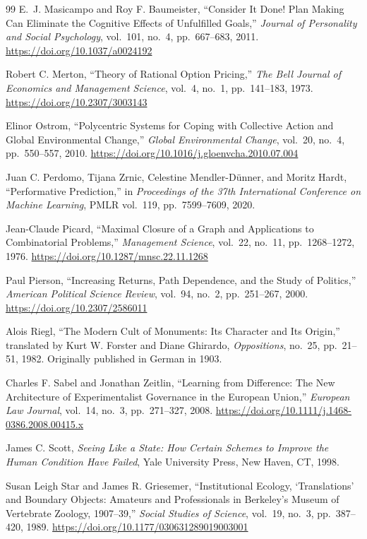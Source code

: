 \begin{thebibliography}{99}
E.~J. Masicampo and Roy F. Baumeister,
``Consider It Done! Plan Making Can Eliminate the Cognitive Effects
of Unfulfilled Goals,''
\textit{Journal of Personality and Social Psychology},
vol.~101, no.~4, pp.~667--683, 2011.
\url{https://doi.org/10.1037/a0024192}

Robert C. Merton,
``Theory of Rational Option Pricing,''
\textit{The Bell Journal of Economics and Management Science},
vol.~4, no.~1, pp.~141--183, 1973.
\url{https://doi.org/10.2307/3003143}

Elinor Ostrom,
``Polycentric Systems for Coping with Collective Action and Global
Environmental Change,''
\textit{Global Environmental Change},
vol.~20, no.~4, pp.~550--557, 2010.
\url{https://doi.org/10.1016/j.gloenvcha.2010.07.004}

Juan C. Perdomo, Tijana Zrnic, Celestine Mendler-D\"unner, and Moritz Hardt,
``Performative Prediction,''
in \textit{Proceedings of the 37th International Conference on Machine Learning},
PMLR vol.~119, pp.~7599--7609, 2020.

Jean-Claude Picard,
``Maximal Closure of a Graph and Applications to Combinatorial Problems,''
\textit{Management Science},
vol.~22, no.~11, pp.~1268--1272, 1976.
\url{https://doi.org/10.1287/mnsc.22.11.1268}

Paul Pierson,
``Increasing Returns, Path Dependence, and the Study of Politics,''
\textit{American Political Science Review},
vol.~94, no.~2, pp.~251--267, 2000.
\url{https://doi.org/10.2307/2586011}

Alois Riegl,
``The Modern Cult of Monuments: Its Character and Its Origin,''
translated by Kurt W. Forster and Diane Ghirardo,
\textit{Oppositions},
no.~25, pp.~21--51, 1982.
Originally published in German in 1903.

Charles F. Sabel and Jonathan Zeitlin,
``Learning from Difference: The New Architecture of Experimentalist
Governance in the European Union,''
\textit{European Law Journal},
vol.~14, no.~3, pp.~271--327, 2008.
\url{https://doi.org/10.1111/j.1468-0386.2008.00415.x}

James C. Scott,
\textit{Seeing Like a State: How Certain Schemes to Improve the Human
Condition Have Failed},
Yale University Press, New Haven, CT, 1998.

Susan Leigh Star and James R. Griesemer,
``Institutional Ecology, `Translations' and Boundary Objects:
Amateurs and Professionals in Berkeley's Museum of Vertebrate Zoology,
1907--39,''
\textit{Social Studies of Science},
vol.~19, no.~3, pp.~387--420, 1989.
\url{https://doi.org/10.1177/030631289019003001}

\end{thebibliography}
